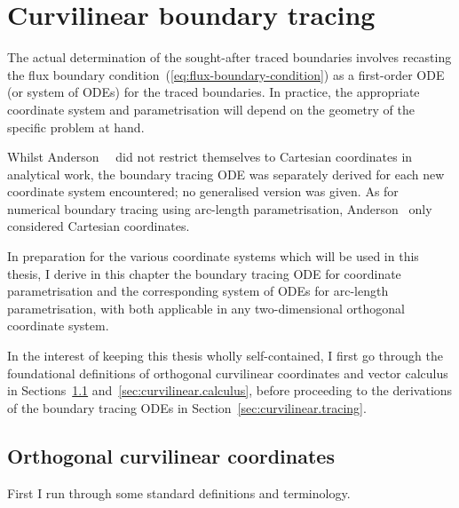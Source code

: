 \chapter{Curvilinear boundary tracing}
\label{ch:curvilinear}

The actual determination of the sought-after traced boundaries involves
recasting the flux boundary condition~(\ref{eq:flux-boundary-condition})
as a first-order ODE (or system of ODEs) for the traced boundaries.
In practice, the appropriate coordinate system and parametrisation
will depend on the geometry of the specific problem at hand.

Whilst Anderson~\etal~\cite{%
  anderson-2007-boundary-tracing-i-theory,%
  anderson-2007-boundary-tracing-ii-applications%
}
did not restrict themselves to Cartesian coordinates in analytical work,
the boundary tracing ODE was separately derived
for each new coordinate system encountered;
no generalised version was given.
As for numerical boundary tracing using arc-length parametrisation,
Anderson~\cite{anderson-2002-thesis-boundary-tracing-pdes}
only considered Cartesian coordinates.

In preparation for the various coordinate systems
which will be used in this thesis,
I derive in this chapter the boundary tracing ODE
for coordinate parametrisation
and the corresponding system of ODEs for arc-length parametrisation,
with both applicable in any two-dimensional orthogonal coordinate system.

In the interest of keeping this thesis wholly self-contained,
I first go through the foundational definitions of
orthogonal curvilinear coordinates and vector calculus
in Sections~\ref{sec:curvilinear.orthogonal}
and~\ref{sec:curvilinear.calculus},
before proceeding to the derivations of the boundary tracing ODEs
in Section~\ref{sec:curvilinear.tracing}.

\section{Orthogonal curvilinear coordinates}
\label{sec:curvilinear.orthogonal}

First I run through some standard definitions and terminology.

